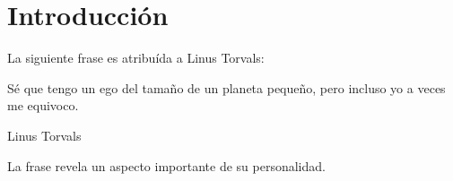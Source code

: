 \documentclass{article}
\begin{document}
\section{Introducción}

La siguiente frase es atribuída a Linus Torvals:

\begin{displayquote}
Sé que tengo un ego del tamaño de un planeta pequeño, pero incluso yo a veces me equivoco.
    \begin{flushright}
        {Linus Torvals}
    \end{flushright}
\end{displayquote}

La frase revela un aspecto importante de su  personalidad.
\end{document}
